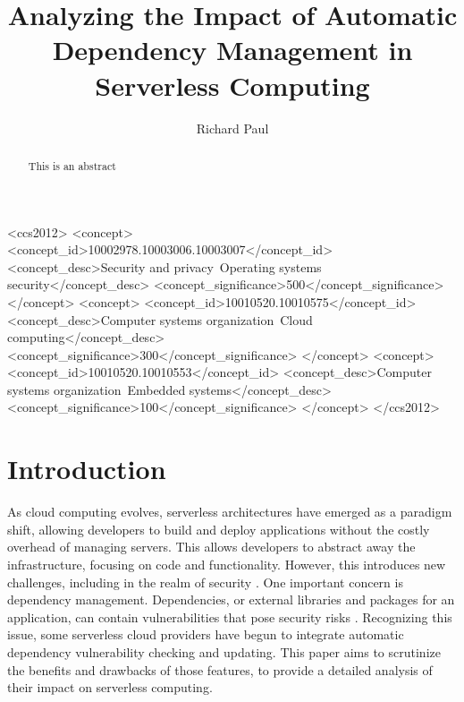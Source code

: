 \documentclass[sigconf]{acmart}
\begin{document}
\title{Analyzing the Impact of Automatic Dependency Management in Serverless Computing}
\author{Richard Paul}

\begin{abstract}
	This is an abstract
\end{abstract}

\begin{CCSXML}
<ccs2012>
	<concept>
		<concept_id>10002978.10003006.10003007</concept_id>
		<concept_desc>Security and privacy~Operating systems security</concept_desc>
		<concept_significance>500</concept_significance>
		</concept>
	<concept>
		<concept_id>10010520.10010575</concept_id>
		<concept_desc>Computer systems organization~Cloud computing</concept_desc>
		<concept_significance>300</concept_significance>
		</concept>
	<concept>
		<concept_id>10010520.10010553</concept_id>
		<concept_desc>Computer systems organization~Embedded systems</concept_desc>
		<concept_significance>100</concept_significance>
		</concept>
</ccs2012>
\end{CCSXML}



\maketitle


\section{Introduction}
As cloud computing evolves, serverless architectures have emerged as a paradigm shift, allowing developers to build and deploy applications without the costly overhead of managing servers. This allows developers to abstract away the infrastructure, focusing on code and functionality. However, this introduces new challenges, including in the realm of security \cite{baldini2017serverless}. One important concern is dependency management. Dependencies, or external libraries and packages for an application, can contain vulnerabilities that pose security risks \cite{marin2022serverless}. Recognizing this issue, some serverless cloud providers have begun to integrate automatic dependency vulnerability checking and updating. This paper aims to scrutinize the benefits and drawbacks of those features, to provide a detailed analysis of their impact on serverless computing.
\end{document}
